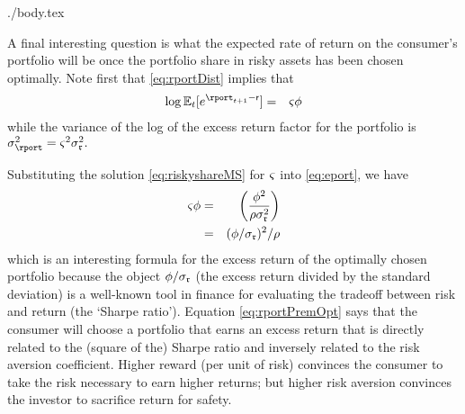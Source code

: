\documentclass{bejournal}
\begin{document}
\begin{verbatimwrite}{./body.tex}
\begin{comment} %
This formula hints at the existence of an `equity premium puzzle'
(\cite{mehra&prescott:puzzle}).  Interpreting the risky asset as the
aggregate stock market, the annual standard deviation of the log of
U.S.\ stock returns has historically been about $\sigma_{\risky}=0.2$
yielding $\Evarr = 0.04$.  The equity premium over historical periods
has been something like $\eprem = 0.08$ (eight percent).  With risk
aversion of $\CRRA=2$ this formula implies that the share of risky
assets in your portfolio should be $0.08/0.08$ or 100 percent!  The
fact that most people have less than 100 percent of their wealth
invested in stocks is the `stockholding puzzle,' the microeconomic
manifestation of the equity premium puzzle
(\cite{haliassos&bertaut:fewholdstocks}).
\end{comment}

A final interesting question is what the expected rate of return on
the consumer's portfolio will be once the portfolio share in risky
assets has been chosen optimally.  Note first that \eqref{eq:rportDist}
implies that 
\begin{eqnarray}
  \log \Ex_{t}[e^{\rport_{t+1}-\rfree}] & = & \riskyshare \eprem  \label{eq:eport}
\end{eqnarray}
while the variance of the log of the excess return factor for the portfolio is $\sigma^{2}_{\rport} = \riskyshare^{2} \sigma^{2}_{\risky}.$

Substituting the solution \eqref{eq:riskyshareMS} for ${\varsigma}$ into \eqref{eq:eport}, we have
\begin{eqnarray}
  {\varsigma} \phi & = & \left(\frac{\phi^{2}}{\rho \sigma_{\mathfrak{r}}^{2}}\right)  \notag
\\ & = &  (\phi/\sigma_{\mathfrak{r}})^{2}/\rho \label{eq:rportPremOpt}
\end{eqnarray}
which is an interesting formula for the excess return of the optimally
chosen portfolio because the object $\phi/\sigma_{\mathfrak{r}}$ (the
excess return divided by the standard deviation) is a well-known tool
in finance for evaluating the tradeoff between risk and return (the
`Sharpe ratio').  Equation \eqref{eq:rportPremOpt} says that the consumer will
choose a portfolio that earns an excess return that is directly
related to the (square of the) Sharpe ratio and inversely related to the risk aversion
coefficient.  Higher reward (per unit of risk) convinces the consumer
to take the risk necessary to earn higher returns; but higher risk
aversion convinces the investor to sacrifice return for safety.


\end{verbatimwrite}
\end{document}
